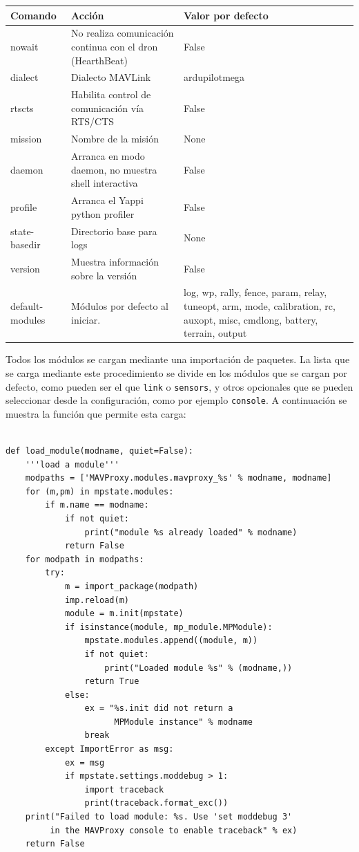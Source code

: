 \begin{center}
  \label{tab:scriptArranqueComandos2}
  \begin{tabular}{ | l | p{7cm} | p{3.5cm} |}
  \hline
    \textbf{Comando} & \textbf{Acción} & \textbf{Valor por defecto} \\ \hline
    nowait&No realiza comunicación continua con el dron (HearthBeat) &  False\\ \hline
    dialect & Dialecto MAVLink& ardupilotmega \\ \hline
    rtscts& Habilita control de comunicación vía RTS/CTS&  False\\ \hline
    mission& Nombre de la misión& None \\ \hline
    daemon & Arranca en modo daemon, no muestra shell interactiva & False \\ \hline
    profile& Arranca el Yappi python profiler& False \\ \hline
    state-basedir& Directorio base para logs& None \\ \hline
    version& Muestra información sobre la versión& False \\ \hline
    default-modules& Módulos por defecto al iniciar.& log, wp, rally, fence, param, relay, tuneopt, arm, mode, calibration, rc, auxopt, misc, cmdlong, battery, terrain, output \\ \hline
  \end{tabular}
\end{center}

Todos los módulos se cargan mediante una importación de paquetes. La lista que se carga mediante este procedimiento se divide en los módulos que se cargan por defecto, como pueden ser el que \texttt{link} o \texttt{sensors}, y otros opcionales que se pueden seleccionar desde la configuración, como por ejemplo \texttt{console}. A continuación se muestra la función que permite esta carga:
\begin{lstlisting}[frame=single]

def load_module(modname, quiet=False):
    '''load a module'''
    modpaths = ['MAVProxy.modules.mavproxy_%s' % modname, modname]
    for (m,pm) in mpstate.modules:
        if m.name == modname:
            if not quiet:
                print("module %s already loaded" % modname)
            return False
    for modpath in modpaths:
        try:
            m = import_package(modpath)
            imp.reload(m)
            module = m.init(mpstate)
            if isinstance(module, mp_module.MPModule):
                mpstate.modules.append((module, m))
                if not quiet:
                    print("Loaded module %s" % (modname,))
                return True
            else:
                ex = "%s.init did not return a 
                      MPModule instance" % modname
                break
        except ImportError as msg:
            ex = msg
            if mpstate.settings.moddebug > 1:
                import traceback
                print(traceback.format_exc())
    print("Failed to load module: %s. Use 'set moddebug 3' 
         in the MAVProxy console to enable traceback" % ex)
    return False
\end{lstlisting}


